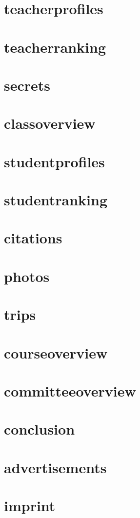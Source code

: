 \documentclass[a4paper, 13pt]{article}
\begin{document}
\part{teacherprofiles}
\part{teacherranking}
\part{secrets}
\part{classoverview}
\part{studentprofiles}
\part{studentranking}
\part{citations}
\part{photos}
\part{trips}
\part{courseoverview}
\part{committeeoverview}
\part{conclusion}
\part{advertisements}
\part{imprint}
\end{document}
